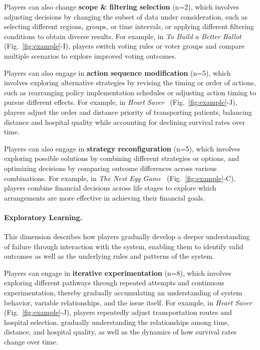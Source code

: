 Players can also change \textbf{scope \& filtering selection} (n=2), which involves adjusting decisions by changing the subset of data under consideration, such as selecting different regions, groups, or time intervals, or applying different filtering conditions to obtain diverse results. For example, in \textit{To Build a Better Ballot}~\cite{ToBuildaBetterBallot} (Fig.~\ref{fig:example}-I), players switch voting rules or voter groups and compare multiple scenarios to explore improved voting outcomes.

Players can also engage in \textbf{action sequence modification} (n=5), which involves exploring alternative strategies by revising the timing or order of actions, such as rearranging policy implementation schedules or adjusting action timing to pursue different effects. For example, in \textit{Heart Saver}~\cite{HeartSaver} (Fig.~\ref{fig:example}-J), players adjust the order and distance priority of transporting patients, balancing distance and hospital quality while accounting for declining survival rates over time.

Players can also engage in \textbf{strategy reconfiguration} (n=5), which involves exploring possible solutions by combining different strategies or options, and optimizing decisions by comparing outcome differences across various combinations. For example, in \textit{The Nest Egg Game}~\cite{TheNestEggGame} (Fig.~\ref{fig:example}-C), players combine financial decisions across life stages to explore which arrangements are more effective in achieving their financial goals.

\paragraph{Exploratory Learning.}
This dimension describes how players gradually develop a deeper understanding of failure through interaction with the system, enabling them to identify valid outcomes as well as the underlying rules and patterns of the system.

Players can engage in \textbf{iterative experimentation} (n=8), which involves exploring different pathways through repeated attempts and continuous experimentation, thereby gradually accumulating an understanding of system behavior, variable relationships, and the issue itself. For example, in \textit{Heart Saver}~\cite{HeartSaver} (Fig.~\ref{fig:example}-J), players repeatedly adjust transportation routes and hospital selection, gradually understanding the relationships among time, distance, and hospital quality, as well as the dynamics of how survival rates change over time.

